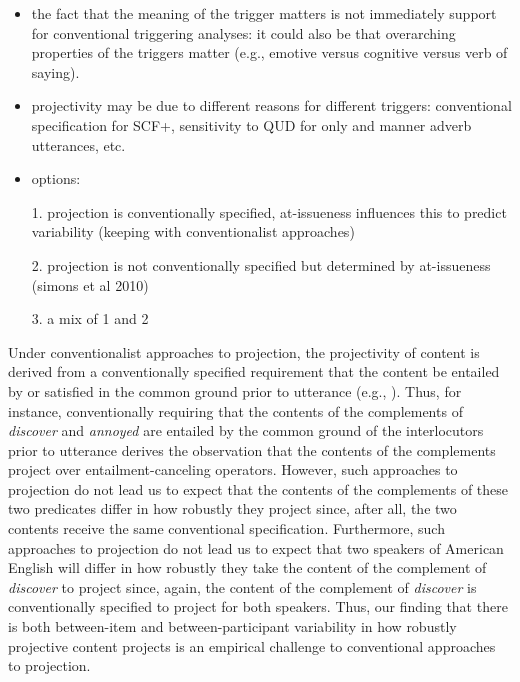 \documentclass[11pt,fleqn]{article}
\newcommand{\6}{\mbox{$[\hspace*{-.6mm}[$}}
\newcommand{\9}{\mbox{$]\hspace*{-.6mm}]$}}
\begin{document}
\begin{itemize}
\item the fact that the meaning of the trigger matters is not immediately support for conventional triggering analyses: it could also be that overarching properties of the triggers matter (e.g., emotive versus cognitive versus verb of saying).

\item projectivity may be due to different reasons for different triggers: conventional specification for SCF+, sensitivity to QUD for only and manner adverb utterances, etc.

\item options: 

1. projection is conventionally specified, at-issueness influences this to predict variability (keeping with conventionalist approaches)

2. projection is not conventionally specified but determined by at-issueness (simons et al 2010)

3. a mix of 1 and 2

\end{itemize}

Under conventionalist approaches to projection, the projectivity of content is derived from a conventionally specified requirement that the content be entailed by or satisfied in the common ground prior to utterance (e.g., \citealt{heim83,vds92}). Thus, for instance, conventionally requiring that the contents of the complements of {\em discover} and {\em annoyed} are entailed by the common ground of the interlocutors prior to utterance derives the observation that the contents of the complements project over entailment-canceling operators. However, such approaches to projection do not lead us to expect that the contents of the complements of these two predicates differ in how robustly they project since, after all, the two contents receive the same conventional specification. Furthermore, such approaches to projection do not lead us to expect that two speakers of American English will differ in how robustly they take the content of the complement of {\em discover} to project since, again, the content of the complement of {\em discover} is conventionally specified to project for both speakers. Thus, our finding that there is both between-item and between-participant variability in how robustly projective content projects is an empirical challenge to conventional approaches to projection. 
\end{document}
